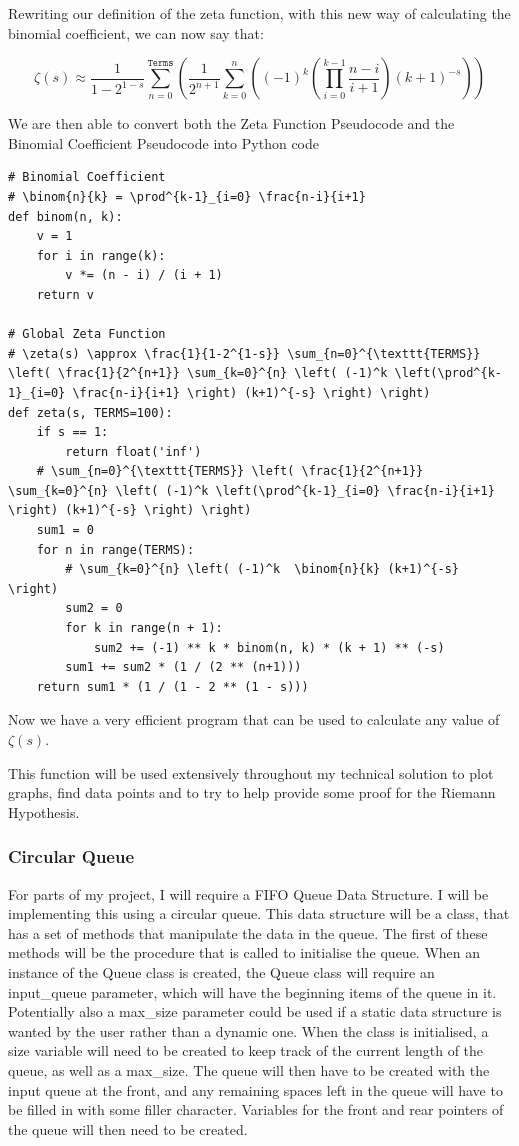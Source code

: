 \documentclass{article}
\begin{document}
Rewriting our definition of the zeta function, with this new way of calculating the binomial coefficient, we can now say that:

$$\zeta(s) \approx \frac{1}{1-2^{1-s}} \sum_{n=0}^{\texttt{Terms}} \left( \frac{1}{2^{n+1}} \sum_{k=0}^{n} \left( (-1)^k \left(\prod^{k-1}_{i=0} \frac{n-i}{i+1} \right) (k+1)^{-s} \right) \right)$$

\clearpage
We are then able to convert both the Zeta Function Pseudocode and the Binomial Coefficient Pseudocode into Python code
\begin{lstlisting}
# Binomial Coefficient
# \binom{n}{k} = \prod^{k-1}_{i=0} \frac{n-i}{i+1}
def binom(n, k):
    v = 1
    for i in range(k):
        v *= (n - i) / (i + 1)
    return v

# Global Zeta Function
# \zeta(s) \approx \frac{1}{1-2^{1-s}} \sum_{n=0}^{\texttt{TERMS}} \left( \frac{1}{2^{n+1}} \sum_{k=0}^{n} \left( (-1)^k \left(\prod^{k-1}_{i=0} \frac{n-i}{i+1} \right) (k+1)^{-s} \right) \right)
def zeta(s, TERMS=100):
    if s == 1:
        return float('inf')
    # \sum_{n=0}^{\texttt{TERMS}} \left( \frac{1}{2^{n+1}} \sum_{k=0}^{n} \left( (-1)^k \left(\prod^{k-1}_{i=0} \frac{n-i}{i+1} \right) (k+1)^{-s} \right) \right)
    sum1 = 0
    for n in range(TERMS):
        # \sum_{k=0}^{n} \left( (-1)^k  \binom{n}{k} (k+1)^{-s} \right)
        sum2 = 0
        for k in range(n + 1):
            sum2 += (-1) ** k * binom(n, k) * (k + 1) ** (-s)
        sum1 += sum2 * (1 / (2 ** (n+1)))
    return sum1 * (1 / (1 - 2 ** (1 - s)))
\end{lstlisting}

Now we have a very efficient program that can be used to calculate any value of $\zeta(s)$.

This function will be used extensively throughout my technical solution to plot graphs, find data points and to try to help provide some proof for the Riemann Hypothesis.

\subsubsection{Circular Queue}
For parts of my project, I will require a FIFO Queue Data Structure. I will be implementing this using a circular queue. This data structure will be a class, that has a set of methods that manipulate the data in the queue. The first of these methods will be the procedure that is called to initialise the queue. When an instance of the Queue class is created, the Queue class will require an input\_queue parameter, which will have the beginning items of the queue in it. Potentially also a max\_size parameter could be used if a static data structure is wanted by the user rather than a dynamic one. When the class is initialised, a size variable will need to be created to keep track of the current length of the queue, as well as a max\_size. The queue will then have to be created with the input queue at the front, and any remaining spaces left in the queue will have to be filled in with some filler character. Variables for the front and rear pointers of the queue will then need to be created.
\end{document}
